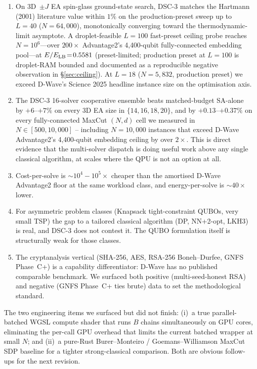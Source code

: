 \documentclass[11pt,a4paper]{article}
\begin{document}
\begin{enumerate}\itemsep0.15em
\item[(1)] On 3D~$\pm J$ EA spin-glass ground-state search, DSC-3
  matches the Hartmann (2001) literature value within $1\%$ on the
  production-preset sweep up to $L\!=\!40$ ($N\!=\!64{,}000$),
  monotonically converging toward the thermodynamic-limit asymptote.
  A droplet-feasible $L\!=\!100$ fast-preset ceiling probe reaches
  $N\!=\!10^{6}$---over $200\times$ Advantage2's 4{,}400-qubit
  fully-connected embedding pool---at $E/E_{\rm LB}\!=\!0.5581$
  (preset-limited; production preset at $L\!=\!100$ is droplet-RAM
  bounded and documented as a reproducible negative observation in
  \S\ref{sec:ceiling}). At $L\!=\!18$ ($N\!=\!5{,}832$, production
  preset) we exceed D-Wave's Science 2025 headline instance size on
  the optimisation axis.
\item[(2)] The DSC-3 16-solver cooperative ensemble beats matched-budget
  SA-alone by $+6$--$+7\%$ on every 3D EA size in $\{14, 16, 18, 20\}$,
  and by $+0.13$--$+0.37\%$ on every fully-connected MaxCut
  $(N, d)$ cell we measured in $N \in [500, 10{,}000]$ -- including
  $N\!=\!10{,}000$ instances that exceed D-Wave Advantage2's 4{,}400-qubit
  embedding ceiling by over $2\times$. This is direct evidence that
  the multi-solver dispatch is doing useful work above any single
  classical algorithm, at scales where the QPU is not an option at all.
\item[(3)] Cost-per-solve is $\sim\!10^4\!-\!10^5\times$ cheaper than
  the amortised D-Wave Advantage2 floor at the same workload class,
  and energy-per-solve is $\sim\!40\times$ lower.
\item[(4)] For asymmetric problem classes (Knapsack tight-constraint
  QUBOs, very small TSP) the gap to a tailored classical algorithm
  (DP, NN+2-opt, LKH3) is real, and DSC-3 does not contest it. The
  QUBO formulation itself is structurally weak for those classes.
\item[(5)] The cryptanalysis vertical (SHA-256, AES, RSA-256
  Boneh--Durfee, GNFS Phase~C+) is a capability differentiator: D-Wave
  has no published comparable benchmark. We surfaced both positive
  (multi-seed-honest RSA) and negative (GNFS Phase~C+ ties brute) data
  to set the methodological standard.
\end{enumerate}

The two engineering items we surfaced but did not finish:
(i)~a true parallel-batched WGSL compute shader that runs $B$ chains
simultaneously on GPU cores, eliminating the per-call GPU overhead that
limits the current batched wrapper at small $N$; and (ii)~a
pure-Rust Burer--Monteiro / Goemans--Williamson MaxCut SDP baseline
for a tighter strong-classical comparison. Both are obvious follow-ups
for the next revision.
\end{document}
